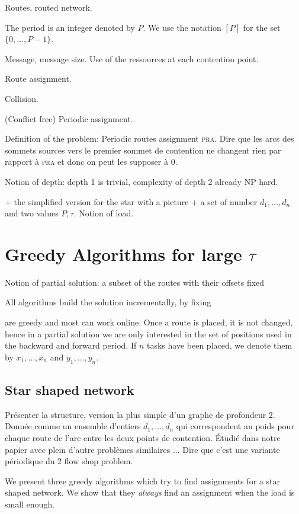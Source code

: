 \documentclass[10pt, conference, letterpaper]{IEEEtran}
\newcommand\pra{\textsc{pra}\xspace}
\begin{document}
Routes, routed network.

The period is an integer denoted by $P$. We use the notation $[P]$ for the set $\{0,\dots,P-1\}$. 

Message, message size. Use of the ressources at each contention point.

Route assignment.

Collision. 

(Conflict free) Periodic assignment. 

Definition of the problem: Periodic routes assignment \pra.
Dire que les arcs des sommets sources vers le premier sommet de contention
ne changent rien par rapport à \pra et donc on peut les supposer à $0$.

Notion of depth: depth 1 is trivial, complexity of depth 2 already NP hard. 

 + the simplified version for the star with a picture + a set of number $d_1,\dots,d_n$ and two values $P, \tau$. Notion of load.
\cite{Guir1806:Deterministic}


\section{Greedy Algorithms for large $\tau$}

Notion of partial solution: a subset of the routes with their offsets fixed 

 All algorithms build the solution incrementally, by fixing 

 are greedy and most can work online. Once a route is placed,
it is not changed, hence in a partial solution we are only interested in the 
set of positions used in the backward and forward period. If $n$ tasks have been
placed, we denote them by $x_1, \dots, x_n$ and $y_1,\dots,y_n$.

\subsection{Star shaped network}

Présenter la structure, version la plus simple d'un graphe de profondeur $2$.
Donnée comme un ensemble d'entiers $d_1,\dots,d_n$ qui correspondent 
au poids pour chaque route de l'arc entre les deux points de contention.
Étudié dans notre papier avec plein d'autre problèmes similaires ...
Dire que c'est une variante périodique du 2 flow shop problem. 


We present three greedy algorithms which try to find assignments for a star shaped
network. We show that they \emph{always} find an assignment when the load 
is small enough.
\end{document}
